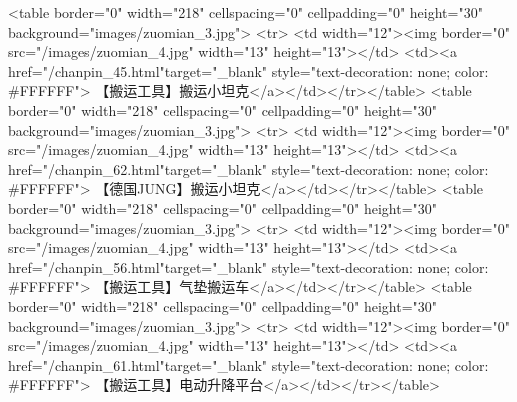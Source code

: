                                                             <table border="0" width="218" cellspacing="0" cellpadding="0" height="30" background="images/zuomian_3.jpg">
                                                                <tr>
                                                                    <td width="12"><img border="0" src="/images/zuomian_4.jpg" width="13" height="13"></td>
                                                                    <td><a href="/chanpin_45.html"target="_blank" style="text-decoration: none; color: #FFFFFF">
                                                                            【搬运工具】搬运小坦克</a></td></tr></table>
                                                            <table border="0" width="218" cellspacing="0" cellpadding="0" height="30" background="images/zuomian_3.jpg">
                                                                <tr>
                                                                    <td width="12"><img border="0" src="/images/zuomian_4.jpg" width="13" height="13"></td>
                                                                    <td><a href="/chanpin_62.html"target="_blank" style="text-decoration: none; color: #FFFFFF">
                                                                            【德国JUNG】搬运小坦克</a></td></tr></table>
                                                            <table border="0" width="218" cellspacing="0" cellpadding="0" height="30" background="images/zuomian_3.jpg">
                                                                <tr>
                                                                    <td width="12"><img border="0" src="/images/zuomian_4.jpg" width="13" height="13"></td>
                                                                    <td><a href="/chanpin_56.html"target="_blank" style="text-decoration: none; color: #FFFFFF">
                                                                            【搬运工具】气垫搬运车</a></td></tr></table>
                                                            <table border="0" width="218" cellspacing="0" cellpadding="0" height="30" background="images/zuomian_3.jpg">
                                                                <tr>
                                                                    <td width="12"><img border="0" src="/images/zuomian_4.jpg" width="13" height="13"></td>
                                                                    <td><a href="/chanpin_61.html"target="_blank" style="text-decoration: none; color: #FFFFFF">
                                                                            【搬运工具】电动升降平台</a></td></tr></table>
